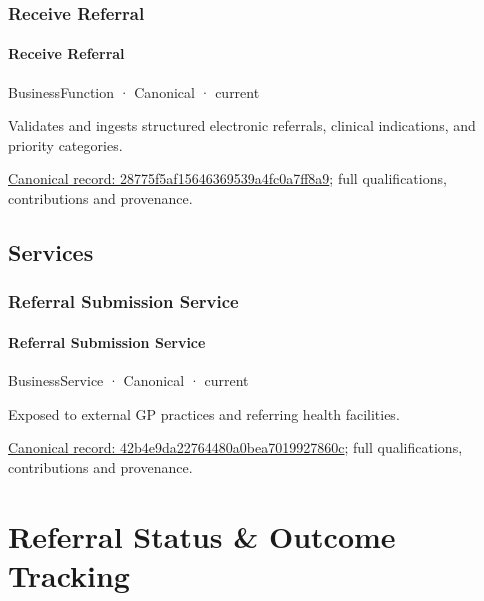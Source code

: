 \subsubsection{Receive Referral}

\paragraph{Receive Referral}

\label{element:28775f5af15646369539a4fc0a7ff8a9}
{\small BusinessFunction · Canonical · current}\par

Validates and ingests structured electronic referrals, clinical indications, and priority categories.


{\footnotesize \href{../../../../continuum/business/business-function/28775f5af15646369539a4fc0a7ff8a9.md}{Canonical record: 28775f5af15646369539a4fc0a7ff8a9}; full qualifications, contributions and provenance.}\par
\subsection{Services}

\subsubsection{Referral Submission Service}

\paragraph{Referral Submission Service}

\label{element:42b4e9da22764480a0bea7019927860c}
{\small BusinessService · Canonical · current}\par

Exposed to external GP practices and referring health facilities.


{\footnotesize \href{../../../../continuum/business/business-service/42b4e9da22764480a0bea7019927860c.md}{Canonical record: 42b4e9da22764480a0bea7019927860c}; full qualifications, contributions and provenance.}\par
\section{Referral Status \& Outcome Tracking}

